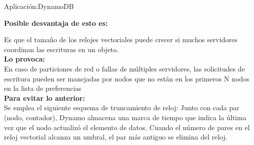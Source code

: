 \begin{frame}[fragile]{Aplicación:}{DynamoDB}
    \justifying

{\bf Posible desvantaja de esto es:}

Es que el tamaño de los relojes vectoriales puede crecer si muchos servidores
coordinan las escrituras en un objeto.\\[0.3cm]

{\bf Lo provoca:}\\[0.3cm]
En caso de particiones de red o fallas de múltiples
servidores, las solicitudes de escritura pueden ser manejadas por nodos que no
están en los primeros N nodos en la lista de preferencias\\[0.3cm]

{\bf Para evitar lo anterior:}\\[0.3cm]
Se emplea el siguiente esquema de truncamiento de reloj:
Junto con cada par (nodo, contador), Dynamo almacena una marca de tiempo que
indica la última vez que el nodo actualizó el elemento de datos. Cuando el
número de pares en el reloj vectorial alcanza un umbral, el par más antiguo se
elimina del reloj.
\end{frame}
